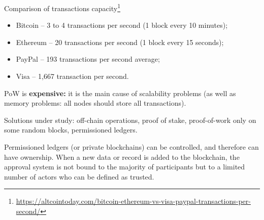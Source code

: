 Comparison of transactions capacity\footnote{\url{https://altcointoday.com/bitcoin-ethereum-vs-visa-paypal-transactions-per-second/}}
\begin{itemize}
	\item Bitcoin – 3 to 4 transactions per second (1 block every 10 minutes);
	\item Ethereum – 20 transactions per second (1 block every 15 seconds);
	\item PayPal – 193 transactions per second average;
	\item Visa – 1,667 transaction per second.
\end{itemize}

PoW is \textbf{expensive:} it is the main cause of scalability problems (as well as memory problems: all nodes should store all transactions).

Solutions under study: off-chain operations, proof of stake, proof-of-work only on some random blocks, permissioned ledgers.

Permissioned ledgers (or private blockchains) can be controlled, and therefore can have ownership. When a new data or record is added to the blockchain, the approval system is not bound to the majority of participants but to a limited number of actors who can be defined as trusted.

